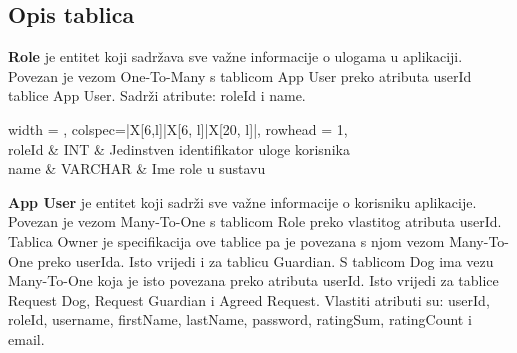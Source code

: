 		
			\subsection{Opis tablica}
			
			
			\textbf{Role} je entitet koji sadržava sve važne informacije o ulogama u  aplikaciji. Povezan je vezom One-To-Many s tablicom App User preko atributa userId tablice App User. Sadrži atribute: roleId i name.
			
			
			
			
			\begin{longtblr}[
				label=none,
				entry=none
				]{
					width = \textwidth,
					colspec={|X[6,l]|X[6, l]|X[20, l]|}, 
					rowhead = 1,
				} %
				\hline {}	 \\ \hline[3pt]
				roleId	& INT &  Jedinstven identifikator uloge korisnika 	\\ \hline
				name & VARCHAR &  Ime role u sustavu \\ \hline
			 
			\end{longtblr}
			
			\textbf{App User} je entitet koji sadrži sve važne informacije o korisniku aplikacije. Povezan je vezom Many-To-One s tablicom Role preko vlastitog atributa userId. Tablica Owner je specifikacija ove tablice pa je povezana s njom vezom Many-To-One preko userIda. Isto vrijedi i za tablicu Guardian. S tablicom Dog ima vezu Many-To-One koja je isto povezana preko atributa userId. Isto vrijedi za tablice Request Dog, Request Guardian i Agreed Request. Vlastiti atributi su: userId, roleId, username, firstName, lastName, password, ratingSum, ratingCount i email.

				
				
